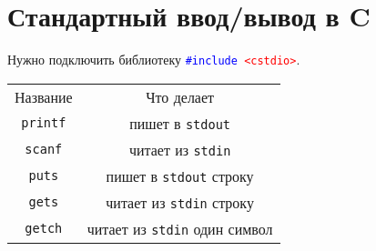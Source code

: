 \documentclass {article}
\begin{document}
\section{Стандартный ввод/вывод в C}
Нужно подключить библиотеку \texttt{\textcolor{blue}{\#include} \textcolor{red}{<cstdio>}}.\\
\def\tabrowsep{\noalign{\vskip 1.2pt}}
\begin{center}
\begin{tabular}{c c}
\rowcolor[rgb]{0.8,0.2,0.2} Название & Что делает \\\tabrowsep
\rowcolor[rgb]{0.7,0.7,0.7} \texttt{printf} & пишет в \texttt{stdout} \\\tabrowsep
\rowcolor[rgb]{0.7,0.7,0.7} \texttt{scanf} & читает из \texttt{stdin} \\\tabrowsep
\rowcolor[rgb]{0.7,0.7,0.7} \texttt{puts} & пишет в \texttt{stdout} строку \\\tabrowsep
\rowcolor[rgb]{0.7,0.7,0.7} \texttt{gets} & читает из \texttt{stdin} строку\\\tabrowsep
\rowcolor[rgb]{0.7,0.7,0.7} \texttt{getch} & читает из \texttt{stdin} один символ \\
\end{tabular}
\end{center}
\end{document}
